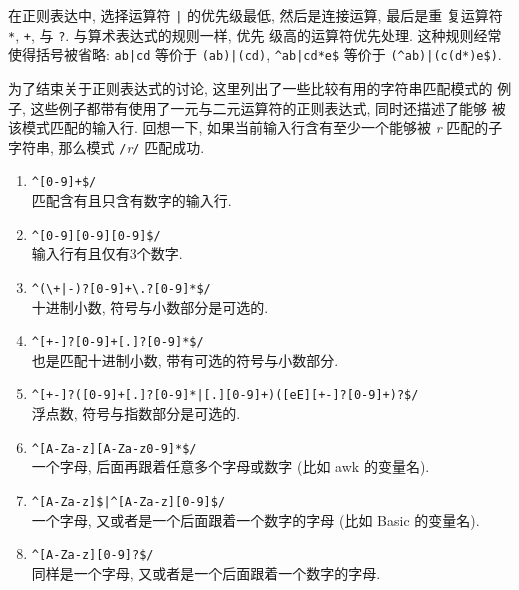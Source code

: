 在正则表达中, 选择运算符 \verb'|' 的优先级最低, 然后是连接运算, 最后是重
复运算符 \verb'*', \verb'+', 与 \verb'?'. 与算术表达式的规则一样, 优先
级高的运算符优先处理. 这种规则经常使得括号被省略: \verb'ab|cd' 等价于
\verb'(ab)|(cd)', \verb'^ab|cd*e$' 等价于 \verb'(^ab)|(c(d*)e$)'.

为了结束关于正则表达式的讨论, 这里列出了一些比较有用的字符串匹配模式的
例子, 这些例子都带有使用了一元与二元运算符的正则表达式, 同时还描述了能够
被该模式匹配的输入行. 回想一下, 如果当前输入行含有至少一个能够被
\textit{r} 匹配的子字符串, 那么模式 \verb'/'\textit{r}\verb'/'
匹配成功.
\begin{enumerate}
\item \verb'^[0-9]+$/' \\
    匹配含有且只含有数字的输入行.
\item \verb'^[0-9][0-9][0-9]$/' \\
    输入行有且仅有3个数字.
\item \verb'^(\+|-)?[0-9]+\.?[0-9]*$/' \\
    十进制小数, 符号与小数部分是可选的.
\item \verb'^[+-]?[0-9]+[.]?[0-9]*$/' \\
    也是匹配十进制小数, 带有可选的符号与小数部分.
\item \verb'^[+-]?([0-9]+[.]?[0-9]*|[.][0-9]+)([eE][+-]?[0-9]+)?$/' \\
    浮点数, 符号与指数部分是可选的.
\item \verb'^[A-Za-z][A-Za-z0-9]*$/' \\
    一个字母, 后面再跟着任意多个字母或数字 (比如 awk 的变量名).
\item \verb'^[A-Za-z]$|^[A-Za-z][0-9]$/' \\
    一个字母, 又或者是一个后面跟着一个数字的字母 (比如 Basic 的变量名).
\item \verb'^[A-Za-z][0-9]?$/' \\
    同样是一个字母, 又或者是一个后面跟着一个数字的字母.
\end{enumerate}
